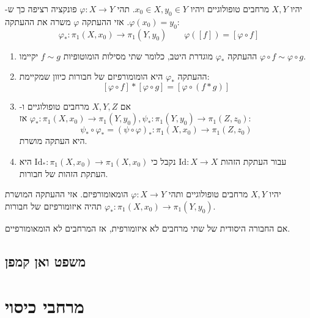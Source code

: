 \documentclass{tstextbook}
\begin{document}
\begin{definition}
יהיו \(X,Y\) מרחבים טופולוגיים ויהיו \(x_{0} \in X,y_{0} \in Y\). תהי \(\varphi:X\to Y\) פונקציה רציפה כך ש-\(\varphi(x_{0})=y_{0}\). אזי ההעתקה \(\varphi\) משרה את ההעתקה:
$$\varphi_{*}:\pi_{1}(X,x_{0})\to\pi_{1}(Y,y_{0})\qquad \varphi([f])=\left[ \varphi \circ  f \right]$$

\end{definition}
\begin{proposition}
  \begin{enumerate}
    \item ההעתקה \(\varphi_{*}\) מוגדרת היטב, כלומר שתי מסילות הומוטופיות \(f\sim g\) יקיימו \(\varphi \circ f \sim \varphi \circ g\). 


    \item ההעתקה \(\varphi_{*}\) היא הומומורפיזם של חבורות כיוון שמקיימת: 
$$\left[ \varphi \circ f \right]*\left[ \varphi \circ g \right]=\left[ \varphi \circ (f*g) \right]$$


    \item אם \(X,Y,Z\) מרחבים טופולוגיים ו-\(\varphi_{*}:\pi_{1}(X,x_{0})\to\pi_{1}(Y,y_{0}),\psi_*:\pi_{1}(Y,y_{0})\to\pi_{1}(Z,z_{0})\) אז: 
$$\psi_{*}\circ \varphi_{*}=\left( \psi\circ \varphi \right)_{*}:\pi_{1}(X,x_{0})\to\pi_{1}(Z,z_{0})$$
היא העתקה מושרת.


    \item עבור העתקת הזהות \(\mathrm{Id}:X\to X\) נקבל כי \(\mathrm{Id}_{*}:\pi_{1}(X,x_{0})\to\pi_{1}(X,x_{0})\) היא העתקת הזהות של חבורות. 


  \end{enumerate}
\end{proposition}
\begin{proposition}
יהיו \(X,Y\) מרחבים טופולוגיים ותהי \(\varphi:X\to Y\) הומאומורפיזם. אזי ההעתקה המושרת \(\varphi_{*}:\pi_{1}(X,x_{0})\to\pi_{1}(Y,y_{0})\) תהיה איזומורפיזם של חבורות.

\end{proposition}
\begin{corollary}
אם החבורה היסודית של שתי מרחבים לא איזומורפית, אז המרחבים לא הומאומורפיים.

\end{corollary}
\section{משפט ואן קמפן}

\chapter{מרחבי כיסוי}
\end{document}
